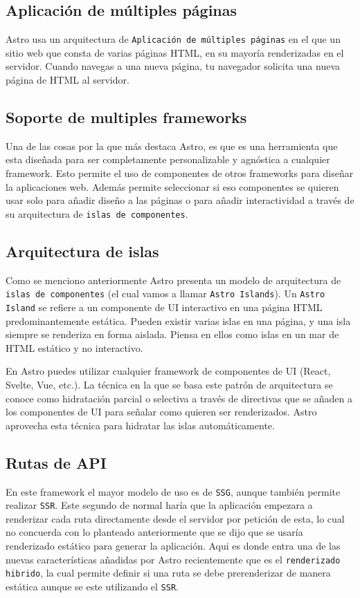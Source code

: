 \subsection{Aplicación de múltiples páginas}
Astro usa un arquitectura de \verb|Aplicación de múltiples páginas|\cite{multipage} en el que un sitio web que consta de varias páginas HTML, en su mayoría renderizadas en el servidor. Cuando navegas a una nueva página, tu navegador solicita una nueva página de HTML al servidor.

\subsection{Soporte de multiples frameworks}
Una de las cosas por la que más destaca Astro, es que es una herramienta que esta diseñada para ser completamente personalizable y agnóstica a cualquier framework. Esto permite el uso de componentes de otros frameworks para diseñar la aplicaciones web. Además permite seleccionar si eso componentes se quieren usar solo para añadir diseño a las páginas o para añadir interactividad a través de su arquitectura de \verb|islas de componentes|\cite{islas}.

\subsection{Arquitectura de islas}
Como se menciono anteriormente Astro presenta un modelo de arquitectura de \verb|islas de componentes|\cite{islas} (el cual vamos a llamar \verb|Astro Islands|). Un \verb|Astro Island| se refiere a un componente de UI interactivo en una página HTML predominantemente estática. Pueden existir varias islas en una página, y una isla siempre se renderiza en forma aislada. Piensa en ellos como islas en un mar de HTML estático y no interactivo.

En Astro puedes utilizar cualquier framework de componentes de UI (React, Svelte, Vue, etc.). La técnica en la que se basa este patrón de arquitectura se conoce como hidratación parcial o selectiva a través de directivas que se añaden a los componentes de UI para señalar como quieren ser renderizados. Astro aprovecha esta técnica para hidratar las islas automáticamente.

\subsection{Rutas de API}
En este framework el mayor modelo de uso es de \verb|SSG|\cite{ssg}, aunque también permite realizar \verb|SSR|\cite{ssr}. Este segundo de normal haría que la aplicación empezara a renderizar cada ruta directamente desde el servidor por petición de esta, lo cual no concuerda con lo planteado anteriormente que se dijo que se usaría renderizado estático para generar la aplicación. Aqui es donde entra una de las nuevas características añadidas por Astro recientemente que es el \verb|renderizado hibrido|\cite{hibrid}, la cual permite definir si una ruta se debe prerenderizar de manera estática aunque se este utilizando el \verb|SSR|\cite{ssr}.

